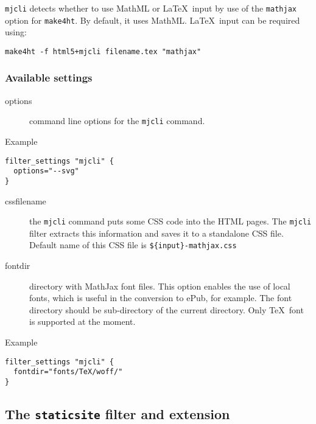 \texttt{mjcli} detects whether to use MathML or \LaTeX~input by use of
the \texttt{mathjax} option for \texttt{make4ht}. By default, it uses
MathML. \LaTeX~input can be required using:

\begin{verbatim}
make4ht -f html5+mjcli filename.tex "mathjax"
\end{verbatim}

\hypertarget{available-settings}{%
\subsubsection{Available settings}\label{available-settings}}

\begin{description}
\item[options]
command line options for the \texttt{mjcli} command.
\end{description}

Example

\begin{verbatim}
filter_settings "mjcli" {
  options="--svg"
}
\end{verbatim}

\begin{description}
\item[cssfilename]
the \texttt{mjcli} command puts some CSS code into the HTML pages. The
\texttt{mjcli} filter extracts this information and saves it to a
standalone CSS file. Default name of this CSS file is
\texttt{\$\{input\}-mathjax.css}
\item[fontdir]
directory with MathJax font files. This option enables the use of local
fonts, which is useful in the conversion to ePub, for example. The font
directory should be sub-directory of the current directory. Only
\TeX~font is supported at the moment.
\end{description}

Example

\begin{verbatim}
filter_settings "mjcli" {
  fontdir="fonts/TeX/woff/" 
}
\end{verbatim}

\hypertarget{the-staticsite-filter-and-extension}{%
\subsection{\texorpdfstring{The \texttt{staticsite} filter and
extension}{The staticsite filter and extension}}\label{the-staticsite-filter-and-extension}}


